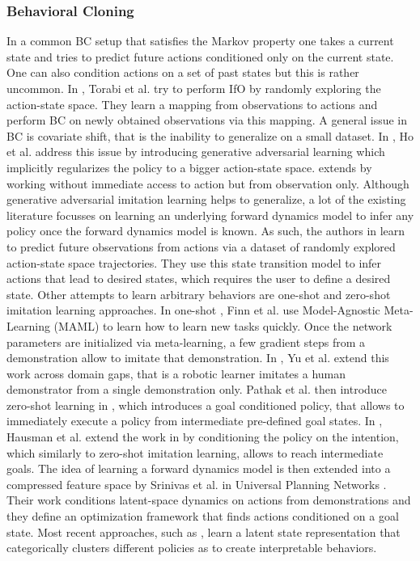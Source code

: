 \subsubsection{Behavioral Cloning}
In a common BC setup that satisfies the Markov property one takes a current state and tries to predict future actions conditioned only on the current state. One can also condition actions on a set of past states \cite{xu2017end} but this is rather uncommon. In \cite{torabi2018behavioral}, Torabi et al. try to perform IfO by randomly exploring the action-state space. They learn a mapping from observations to actions and perform BC on newly obtained observations via this mapping. A general issue in BC is covariate shift, that is the inability to generalize on a small dataset. In \cite{ho2016generative}, Ho et al. address this issue by introducing generative adversarial learning which implicitly regularizes the policy to a bigger action-state space. \cite{torabi2018generative} extends \cite{ho2016generative} by working without immediate access to action but from observation only. Although generative adversarial imitation learning helps to generalize, a lot of the existing literature focusses on learning an underlying forward dynamics model to infer any policy once the forward dynamics model is known. As such, the authors in \cite{finn2016unsupervised, finn2017deep, nair2017combining} learn to predict future observations from actions via a dataset of randomly explored action-state space trajectories. They use this state transition model to infer actions that lead to desired states, which requires the user to define a desired state. Other attempts to learn arbitrary behaviors are one-shot and zero-shot imitation learning approaches. In one-shot \cite{finn2017one}, Finn et al. use Model-Agnostic Meta-Learning (MAML) to learn how to learn new tasks quickly. Once the network parameters are initialized via meta-learning, a few gradient steps from a demonstration allow to imitate that demonstration. In \cite{yu2018one}, Yu et al. extend this work across domain gaps, that is a robotic learner imitates a human demonstrator from a single demonstration only. Pathak et al. then introduce zero-shot learning in \cite{pathak2018zero}, which introduces a goal conditioned policy, that allows to immediately execute a policy from intermediate pre-defined goal states. In \cite{hausman2017multi}, Hausman et al. extend the work in \cite{ho2016generative} by conditioning the policy on the intention, which similarly to zero-shot imitation learning, allows to reach intermediate goals. The idea of learning a forward dynamics model is then extended into a compressed feature space by Srinivas et al. in Universal Planning Networks \cite{srinivas2018universal}. Their work conditions latent-space dynamics on actions from demonstrations and they define an optimization framework that finds actions conditioned on a goal state. Most recent approaches, such as \cite{lynch2020learning}, learn a latent state representation that categorically clusters different policies as to create interpretable behaviors.

